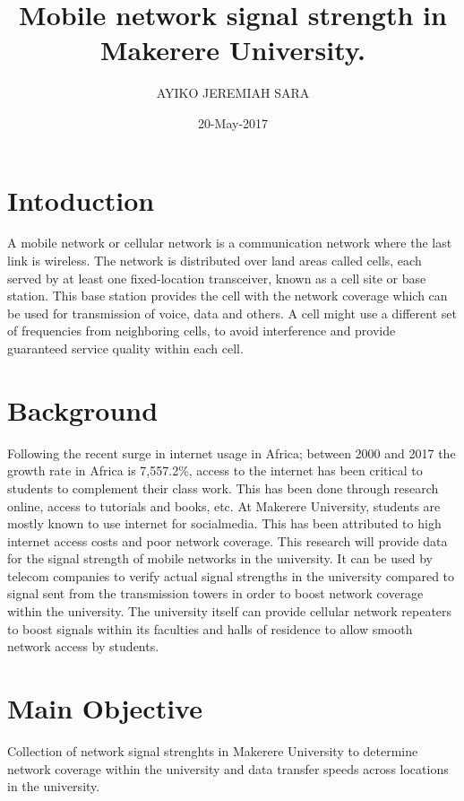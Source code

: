 \documentclass{article}
\begin{document}
\title{Mobile network signal strength in Makerere University.}
\date{20-May-2017}

\author{AYIKO JEREMIAH SARA}


\maketitle
\newpage

\section{Intoduction}
A mobile network or cellular network is a communication network where the last link is wireless. The network is distributed over land areas called cells, each served by at least one fixed-location transceiver, known as a cell site or base station. This base station provides the cell with the network coverage which can be used for transmission of voice, data and others. A cell might use a different set of frequencies from neighboring cells, to avoid interference and provide guaranteed service quality within each cell.\cite{key:1}

\section{Background}
Following the recent surge in internet usage in Africa; between 2000 and 2017 the growth rate in Africa is 7,557.2\%\cite{key:2}, access to the internet has been critical to students to complement their class work. This has been done through research online, access to tutorials and books, etc. At Makerere University, students are mostly known to use internet for socialmedia. This has been attributed to high internet access costs and poor network coverage. This research will provide data for the signal strength of mobile networks in the university. It can be used by telecom companies to verify actual signal strengths in the university compared to signal sent from the transmission towers in order to boost network coverage within the university. The university itself can provide cellular network repeaters to boost signals within its faculties and halls of residence to allow smooth network access by students.

\section{Main Objective}
Collection of network signal strenghts in Makerere University to determine network coverage within the university and data transfer speeds across locations in the university.
\end{document}
